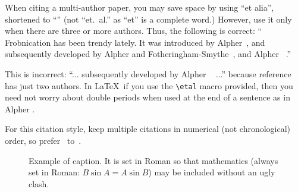{When citing a multi-author paper, you may save space by using ``et alia'',
shortened to ``\etal'' (not ``{et.\ al.}'' as ``{et}'' is a complete word.)
However, use it only when there are three or more authors.  Thus, the
following is correct: ``
   Frobnication has been trendy lately.
   It was introduced by Alpher~\cite{Alpher02}, and subsequently developed by
   Alpher and Fotheringham-Smythe~\cite{Alpher03}, and Alpher \etal~\cite{Alpher04}.''

This is incorrect: ``... subsequently developed by Alpher \etal~\cite{Alpher03} ...''
because reference~\cite{Alpher03} has just two authors. In \LaTeX\, if you use the
\verb'\etal' macro provided, then you need not worry about double periods
when used at the end of a sentence as in Alpher \etal.

For this citation style, keep multiple citations in numerical (not chronological) order, so prefer~\cite{Alpher02, Alpher03, Alpher04} to~\cite{Alpher03, Alpher02, Alpher04}.


%
\begin{figure}[t]
\begin{center}

\end{center}
   \caption{\small Example of caption.  It is set in Roman so that mathematics (always set in Roman: $B \sin A = A \sin B$) may be included without an
   ugly clash.}
\label{fig:long}
\label{fig:onecol}
\end{figure}



}
